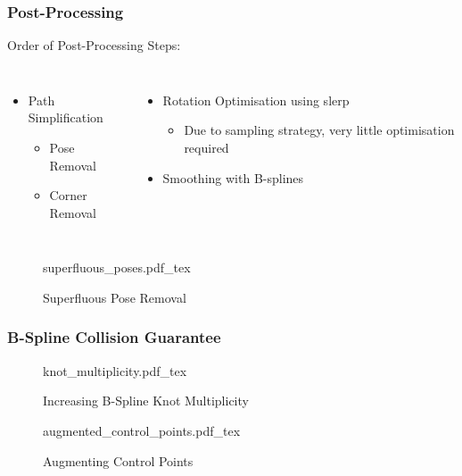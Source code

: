 \begin{frame}
	\frametitle{Post-Processing}

	Order of Post-Processing Steps:

	\begin{columns}

			\begin{itemize}

				\item
					Path Simplification
					\begin{itemize}
						\item Pose Removal
						\item Corner Removal
					\end{itemize}
			\end{itemize}


			\begin{itemize}
				\item Rotation Optimisation using slerp
					\begin{itemize}
						\item Due to sampling strategy, very little optimisation
							required
					\end{itemize}
				\item Smoothing with B-splines

			\end{itemize}


	\end{columns}
		\begin{figure}[hb]
			\centering
			\def\svgwidth{\columnwidth}
			{superfluous_poses.pdf_tex}
			\caption{Superfluous Pose Removal}%
			\label{fig:superfluous_poses}
		\end{figure}
\end{frame}

\begin{frame}
	\frametitle{B-Spline Collision Guarantee}
		\begin{figure}[hbt]
			\centering
			\def\svgwidth{\columnwidth}
			{knot_multiplicity.pdf_tex}
			\caption{Increasing B-Spline Knot Multiplicity}%
			\label{fig:set_of_poses_augmentation}
		\end{figure}

		\begin{figure}[hbt]
			\centering
			\def\svgwidth{\columnwidth}
			{augmented_control_points.pdf_tex}
			\caption{Augmenting Control Points}%
			\label{fig:set_of_poses_augmentation}
		\end{figure}
\end{frame}

